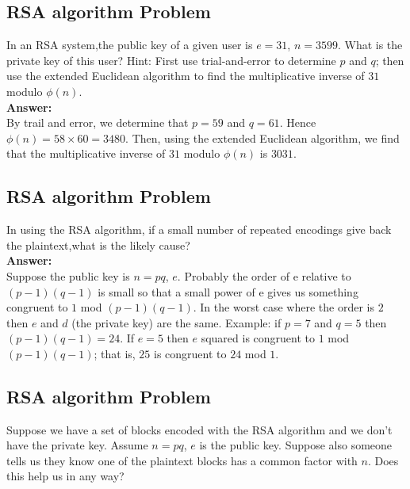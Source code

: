 \documentclass[paper=a4, fontsize=11pt]{scrartcl} %
\numberwithin{equation}{section} %
\numberwithin{figure}{section} %
\numberwithin{table}{section} %
\begin{document}
 \subsection{RSA algorithm Problem \uppercase\expandafter{}}

 In an RSA system,the public key of a given user is $e = 31$, $n = 3599$. What is the private key of this user? Hint: First use trial-and-error to determine $p$ and $q$; then use the extended Euclidean algorithm to find the multiplicative inverse of $31$ modulo $\phi(n)$.\\

 \textbf{Answer:}\\

 By trail and error, we determine that $p = 59$ and $q = 61$. Hence $\phi(n) = 58 \times 60 = 3480$. Then, using the extended Euclidean algorithm, we find that the multiplicative inverse of $31$ modulo $\phi(n)$ is $3031$.

\subsection{RSA algorithm Problem \uppercase\expandafter{}}

 In using the RSA algorithm, if a small number of repeated encodings give back the plaintext,what is the likely cause?\\

 \textbf{Answer:}\\
 Suppose the public key is $n = pq$, $e$. Probably the order of e relative to $(p-1)(q-1)$ is small so that a small power of e gives us something congruent to $1$ mod $(p-1)(q-1)$. In the worst case where the order is $2$ then $e$ and $d$ (the private key) are the same. Example: if $p = 7$ and $q = 5$ then $(p-1)(q-1) = 24$. If $e = 5$ then $e$ squared is congruent to $1$ mod $(p-1)(q-1)$; that is, $25$ is congruent to $24$ mod $1$.


 \subsection{RSA algorithm Problem \uppercase\expandafter{}}

 Suppose we have a set of blocks encoded with the RSA algorithm and we don't have the private key. Assume $n = pq$, $e$ is the public key. Suppose also someone tells us they know one of the plaintext blocks has a common factor with $n$. Does this help us in any way?\\
\end{document}
